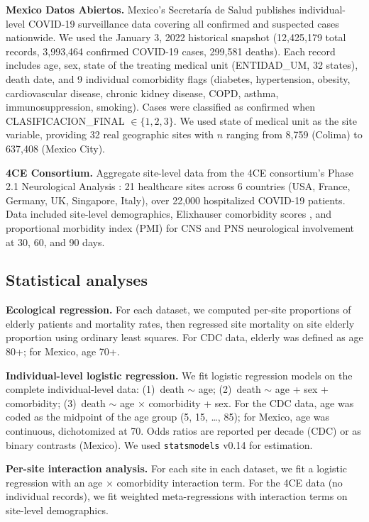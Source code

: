 \documentclass{article}
\begin{document}
\textbf{Mexico Datos Abiertos.}  Mexico's Secretar\'{i}a de Salud publishes
individual-level COVID-19 surveillance data covering all confirmed and
suspected cases nationwide.  We used the January 3, 2022 historical snapshot
(12,425,179 total records, 3,993,464 confirmed COVID-19 cases, 299,581
deaths).  Each record includes age, sex, state of the treating medical unit
(ENTIDAD\_UM, 32 states), death date, and 9 individual comorbidity flags
(diabetes, hypertension, obesity, cardiovascular disease, chronic kidney
disease, COPD, asthma, immunosuppression, smoking).  Cases were classified as
confirmed when CLASIFICACION\_FINAL $\in \{1, 2, 3\}$.  We used state of
medical unit as the site variable, providing 32 real geographic sites with
$n$ ranging from 8,759 (Colima) to 637,408 (Mexico City).

\textbf{4CE Consortium.}  Aggregate site-level data from the 4CE consortium's
Phase 2.1 Neurological Analysis \cite{four_ce_neuro2021}: 21 healthcare sites
across 6 countries (USA, France, Germany, UK, Singapore, Italy), over 22,000
hospitalized COVID-19 patients.  Data included site-level demographics,
Elixhauser comorbidity scores \cite{elixhauser1998}, and proportional morbidity
index (PMI) for CNS and PNS neurological involvement at 30, 60, and 90 days.

\subsection{Statistical analyses}

\textbf{Ecological regression.}  For each dataset, we computed per-site
proportions of elderly patients and mortality rates, then regressed site
mortality on site elderly proportion using ordinary least squares.  For CDC
data, elderly was defined as age 80+; for Mexico, age 70+.

\textbf{Individual-level logistic regression.}  We fit logistic regression
models on the complete individual-level data: (1)~death $\sim$ age;
(2)~death $\sim$ age + sex + comorbidity; (3)~death $\sim$ age $\times$
comorbidity + sex.  For the CDC data, age was coded as the midpoint of the
age group (5, 15, \ldots, 85); for Mexico, age was continuous, dichotomized
at 70.  Odds ratios are reported per decade (CDC) or as binary contrasts
(Mexico).  We used \texttt{statsmodels} v0.14 for estimation.

\textbf{Per-site interaction analysis.}  For each site in each dataset, we
fit a logistic regression with an age $\times$ comorbidity interaction term.
For the 4CE data (no individual records), we fit weighted meta-regressions
with interaction terms on site-level demographics.
\end{document}
